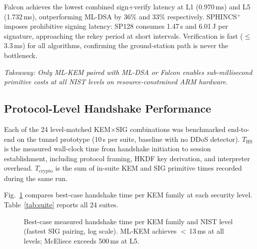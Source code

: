 Falcon achieves the lowest combined sign+verify latency at L1
(0.970\,ms) and L5 (1.732\,ms), outperforming ML-DSA by 36\% and
33\% respectively.  SPHINCS$^+$ imposes prohibitive signing latency:
SP128 consumes 1.47\,s and 6.01\,J per signature, approaching the
rekey period at short intervals.  Verification is fast
($\leq$3.3\,ms) for all algorithms, confirming the ground-station
path is never the bottleneck.

\emph{Takeaway: Only ML-KEM paired with ML-DSA or Falcon enables
sub-millisecond primitive costs at all NIST levels on
resource-constrained ARM hardware.}

\subsection{Protocol-Level Handshake Performance}
\label{sec:suite}

Each of the 24 level-matched KEM$\times$SIG combinations was
benchmarked end-to-end on the tunnel prototype (10\,s per suite,
baseline with no DDoS detector).  $T_\text{HS}$ is the measured
wall-clock time from handshake initiation to session establishment,
including protocol framing, HKDF key derivation, and interpreter
overhead.  $T_\text{crypto}$ is the sum of in-suite KEM and SIG
primitive times recorded during the same run.

Fig.~\ref{fig:suite_hs} compares best-case handshake time per KEM
family at each security level.  Table~\ref{tab:suite} reports all
24 suites.

\begin{figure}[t]
\centering
{}
\caption{Best-case measured handshake time per KEM family and NIST
  level (fastest SIG pairing, log scale).  ML-KEM achieves
  $<$\,13\,ms at all levels; McEliece exceeds 500\,ms at L5.}
\label{fig:suite_hs}
\end{figure}

